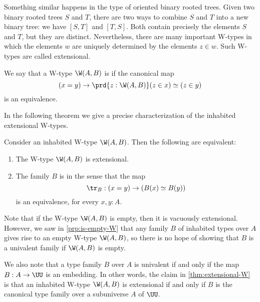 Something similar happens in the type of oriented binary rooted trees. Given two binary rooted trees $S$ and $T$, there are two ways to combine $S$ and $T$ into a new binary tree: we have $[S,T]$ and $[T,S]$. Both contain precisely the elements $S$ and $T$, but they are distinct. Nevertheless, there are many important W-types in which the elements $w$ are uniquely determined by the elements $z\in w$. Such W-types are called extensional.

\begin{defn}
  We say that a W-type $\W(A,B)$ is  if the canonical map
  \begin{equation*}
    (x=y)\to\prd{z:\W(A,B)}(z\in x)\simeq (z\in y)
  \end{equation*}
  is an equivalence.
\end{defn}

In the following theorem we give a precise characterization of the inhabited extensional W-types. 

\begin{thm}\label{thm:extensional-W}
  Consider an inhabited W-type $\W(A,B)$. Then the following are equivalent:
  \begin{enumerate}
  \item The W-type $\W(A,B)$ is extensional.
  \item The family $B$ is  in the sense that the map
  \begin{equation*}
    \tr_B:(x=y)\to (B(x)\simeq B(y))
  \end{equation*}
  is an equivalence, for every $x,y:A$.
  \end{enumerate}
\end{thm}

\begin{rmk}
  Note that if the W-type $\W(A,B)$ is empty, then it is vacuously extensional. However, we saw in \cref{prp:is-empty-W} that any family $B$ of inhabited types over $A$ gives rise to an empty W-type $\W(A,B)$, so there is no hope of showing that $B$ is a univalent family if $\W(A,B)$ is empty.

  We also note that a type family $B$ over $A$ is univalent if and only if the map $B:A\to \UU$ is an embedding. In other words, the claim in \cref{thm:extensional-W} is that an inhabited W-type $\W(A,B)$ is extensional if and only if $B$ is the canonical type family over a subuniverse $A$ of $\UU$.
\end{rmk}

